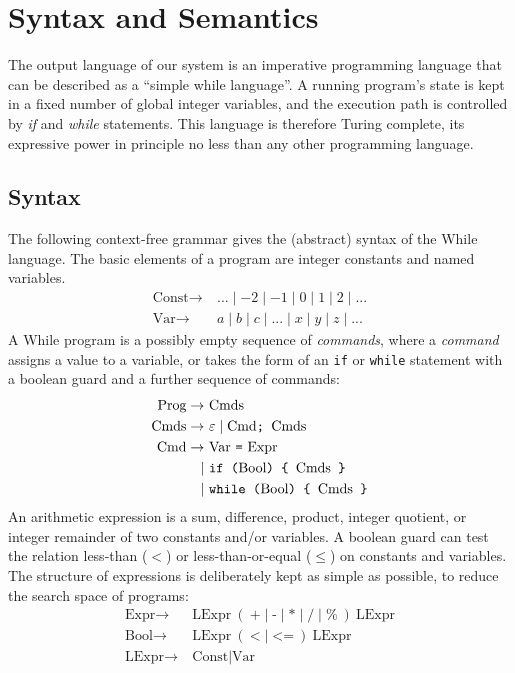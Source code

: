 \documentclass[a4paper,twoside,notitlepage]{report}
\newcommand{\ttt}{\texttt}
\newcommand{\trm}{\textrm}
\begin{document}
\section{Syntax and Semantics}

The output language of our system is an imperative programming language that 
can be described as a ``simple while language''. A running program's state is 
kept in a fixed number of global integer variables, and the execution path is 
controlled by \emph{if} and \emph{while} statements. This language is 
therefore Turing complete, its expressive power in principle no less than any 
other programming language.

\subsection{Syntax}
The following context-free grammar gives the (abstract) syntax of the While 
language. The basic elements of a program are integer constants and named 
variables.
\begin{align*}
   \trm{Const} \to\ & ... \mid -2 \mid -1 \mid 0 \mid 1 \mid 2 \mid ...
\\ \trm{Var}   \to\ & a \mid b \mid c \mid ... \mid x \mid y \mid z \mid ...
\end{align*}
A While program is a possibly empty sequence of \emph{commands}, where a 
\emph{command} assigns a value to a variable, or takes the form of an \ttt{if} 
or \ttt{while} statement with a boolean guard and a further sequence of 
commands:
\begin{align*}
   \trm{Prog}  \to\ & \trm{Cmds}
\\ \trm{Cmds}  \to\ & \varepsilon \mid \trm{Cmd} \ttt{; } \trm{Cmds}
\\ \trm{Cmd}   \to\ & \trm{Var} \ \ttt{=} \ \trm{Expr}
\\            \mid\ & \ttt{if (} \trm{Bool} \ttt{) \char`\{\ } \trm{Cmds} \ttt{ \char`\}}
\\            \mid\ & \ttt{while (} \trm{Bool} \ttt{) \char`\{\ } \trm{Cmds} \ttt{ \char`\}}
\end{align*}
An arithmetic expression is a sum, difference, product, integer quotient, or 
integer remainder of two constants and/or variables. A boolean guard can test 
the relation less-than ($<$) or less-than-or-equal ($\leq$) on constants and 
variables. The structure of expressions is deliberately kept as simple as 
possible, to reduce the search space of programs:
\begin{align*}
   \trm{Expr}  \to\ & \trm{LExpr}\ (\ \ttt{+} \mid \ttt{-} \mid \ttt{*} \mid
                                      \ttt{/} \mid \ttt{\%} \ )\ \trm{LExpr}
\\ \trm{Bool}  \to\ & \trm{LExpr}\ (\ \ttt{<} \mid \ttt{<=}\ )\ \trm{LExpr}
\\ \trm{LExpr} \to\ & \trm{Const} \mid \trm{Var}
\end{align*}
\end{document}
